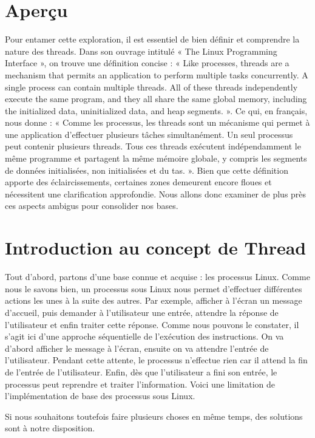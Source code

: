 \section{Aperçu}
    

Pour entamer cette exploration, il est essentiel de bien définir et comprendre la nature des threads. Dans son ouvrage intitulé « The Linux Programming Interface », on trouve une définition concise : « Like processes, threads are a mechanism that permits an application to perform multiple tasks concurrently. A single process can contain multiple threads. All of these threads independently execute the same program, and they all share the same global memory, including the initialized data, uninitialized data, and heap segments. ». Ce qui, en français, nous donne : « Comme les processus, les threads sont un mécanisme qui permet à une application d'effectuer plusieurs tâches simultanément. Un seul processus peut contenir plusieurs threads. Tous ces threads exécutent indépendamment le même programme et partagent la même mémoire globale, y compris les segments de données initialisées, non initialisées et du tas. ». Bien que cette définition apporte des éclaircissements, certaines zones demeurent encore floues et nécessitent une clarification approfondie. Nous allons donc examiner de plus près ces aspects ambigus pour consolider nos bases.



\section{Introduction au concept de Thread}
Tout d’abord, partons d’une base connue et acquise : les processus Linux. Comme nous le savons bien, un processus sous Linux nous permet d’effectuer différentes actions les unes à la suite des autres. Par exemple, afficher à l’écran un message d’accueil, puis demander à l’utilisateur une entrée, attendre la réponse de l’utilisateur et enfin traiter cette réponse. Comme nous pouvons le constater, il s’agit ici d’une approche séquentielle de l’exécution des instructions. On va d'abord afficher le message à l’écran, ensuite on va attendre l’entrée de l’utilisateur. Pendant cette attente, le processus n’effectue rien car il attend la fin de l’entrée de l’utilisateur. Enfin, dès que l’utilisateur a fini son entrée, le processus peut reprendre et traiter l’information. Voici une limitation de l’implémentation de base des processus sous Linux.

Si nous souhaitons toutefois faire plusieurs choses en même temps, des solutions sont à notre disposition.

